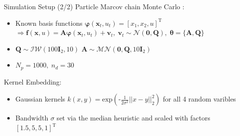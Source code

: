 \documentclass[student, noshadow, lsr, english, aspectratio=169]{ITR_LSR_slides}
\begin{document}
\begin{frame}{Simulation Setup (2/2)}
Particle Marcov chain Monte Carlo \cite{Svensson_17}:
\begin{itemize}
\item Known basis functions $\boldsymbol{\varphi}(\boldsymbol{x}_t, u_t) =  \left[ x_1,  x_2,  u \right]^\text{T}$ \\
	$\Rightarrow \boldsymbol{f}(\boldsymbol{x}, u) = \boldsymbol{A} \boldsymbol{\varphi}(\boldsymbol{x}_t, u_t) + \boldsymbol{v}_{t}, \; \boldsymbol{v}_{t} \sim \mathcal{N} (\boldsymbol{0}, \boldsymbol{Q}), \; \boldsymbol{\theta} = \{\boldsymbol{A}, \boldsymbol{Q}\}$

\item
{} $\boldsymbol{Q} \sim \mathcal{IW} (100 \boldsymbol{I}_2, 10)$ 
\makebox[3cm]{\hfill} $\boldsymbol{A} \sim \mathcal{MN} (\boldsymbol{0}, \boldsymbol{Q}, 10 \boldsymbol{I}_2)$ 
\item $N_p = 1000,\; n_d = 30$
\end{itemize}
Kernel Embedding:
\begin{itemize}
\item Gaussian kernels $k(x,y) = \text{exp}\left(\text{-}\frac{1}{2\sigma^2} ||x - y||_2^2 \right)$ for all 4 random varibles
\item Bandwidth $\sigma$ set via the median heuristic \cite{Damien_18} and scaled with factors $\left[ 1.5, 5, 5, 1 \right]^\text{T}$
\end{itemize}
\end{frame}	
\end{document}
